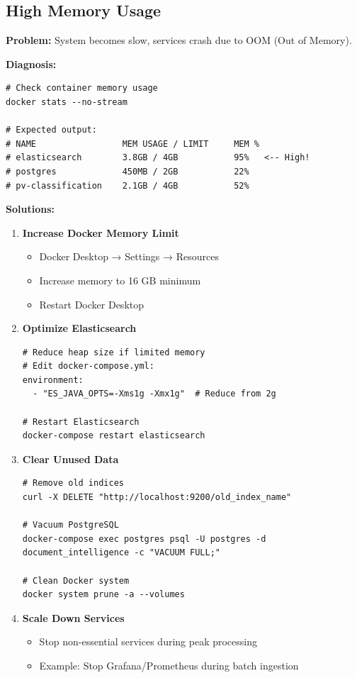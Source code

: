 \subsection{High Memory Usage}

\textbf{Problem:} System becomes slow, services crash due to OOM (Out of Memory).

\textbf{Diagnosis:}
\begin{commandbox}
\begin{lstlisting}[style=bashstyle]
# Check container memory usage
docker stats --no-stream

# Expected output:
# NAME                 MEM USAGE / LIMIT     MEM %
# elasticsearch        3.8GB / 4GB           95%   <-- High!
# postgres             450MB / 2GB           22%
# pv-classification    2.1GB / 4GB           52%
\end{lstlisting}
\end{commandbox}

\textbf{Solutions:}

\begin{enumerate}
    \item \textbf{Increase Docker Memory Limit}
    \begin{itemize}
        \item Docker Desktop → Settings → Resources
        \item Increase memory to 16 GB minimum
        \item Restart Docker Desktop
    \end{itemize}

    \item \textbf{Optimize Elasticsearch}
    \begin{lstlisting}[style=bashstyle]
# Reduce heap size if limited memory
# Edit docker-compose.yml:
environment:
  - "ES_JAVA_OPTS=-Xms1g -Xmx1g"  # Reduce from 2g

# Restart Elasticsearch
docker-compose restart elasticsearch
\end{lstlisting}

    \item \textbf{Clear Unused Data}
    \begin{lstlisting}[style=bashstyle]
# Remove old indices
curl -X DELETE "http://localhost:9200/old_index_name"

# Vacuum PostgreSQL
docker-compose exec postgres psql -U postgres -d document_intelligence -c "VACUUM FULL;"

# Clean Docker system
docker system prune -a --volumes
\end{lstlisting}

    \item \textbf{Scale Down Services}
    \begin{itemize}
        \item Stop non-essential services during peak processing
        \item Example: Stop Grafana/Prometheus during batch ingestion
    \end{itemize}
\end{enumerate}

